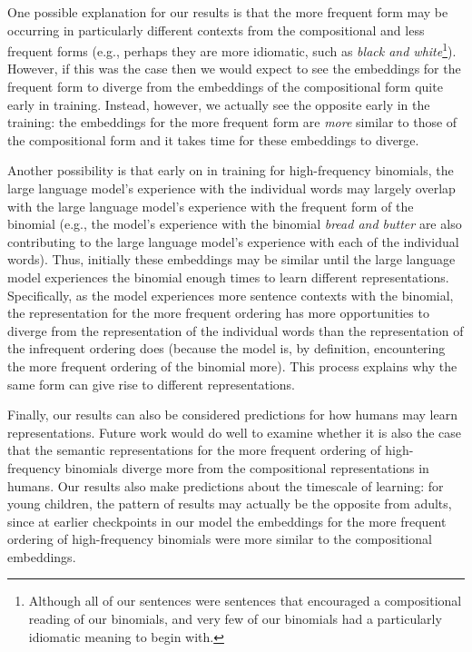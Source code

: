 \documentclass[
  12pt,
  letterpaper,
]{scrreport}
\begin{document}
One possible explanation for our results is that the more frequent form
may be occurring in particularly different contexts from the
compositional and less frequent forms (e.g., perhaps they are more
idiomatic, such as \emph{black and white}\footnote{Although all of our
  sentences were sentences that encouraged a compositional reading of
  our binomials, and very few of our binomials had a particularly
  idiomatic meaning to begin with.}). However, if this was the case then
we would expect to see the embeddings for the frequent form to diverge
from the embeddings of the compositional form quite early in training.
Instead, however, we actually see the opposite early in the training:
the embeddings for the more frequent form are \emph{more} similar to
those of the compositional form and it takes time for these embeddings
to diverge.

Another possibility is that early on in training for high-frequency
binomials, the large language model's experience with the individual
words may largely overlap with the large language model's experience
with the frequent form of the binomial (e.g., the model's experience
with the binomial \emph{bread and butter} are also contributing to the
large language model's experience with each of the individual words).
Thus, initially these embeddings may be similar until the large language
model experiences the binomial enough times to learn different
representations. Specifically, as the model experiences more sentence
contexts with the binomial, the representation for the more frequent
ordering has more opportunities to diverge from the representation of
the individual words than the representation of the infrequent ordering
does (because the model is, by definition, encountering the more
frequent ordering of the binomial more). This process explains why the
same form can give rise to different representations.

Finally, our results can also be considered predictions for how humans
may learn representations. Future work would do well to examine whether
it is also the case that the semantic representations for the more
frequent ordering of high-frequency binomials diverge more from the
compositional representations in humans. Our results also make
predictions about the timescale of learning: for young children, the
pattern of results may actually be the opposite from adults, since at
earlier checkpoints in our model the embeddings for the more frequent
ordering of high-frequency binomials were more similar to the
compositional embeddings.
\end{document}
